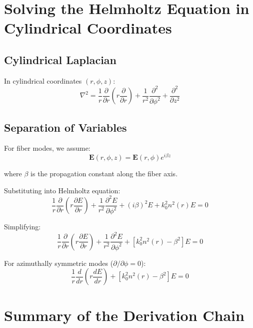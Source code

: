 \documentclass[12pt]{article}
\begin{document}
\section{Solving the Helmholtz Equation in Cylindrical Coordinates}

\subsection{Cylindrical Laplacian}

In cylindrical coordinates $(r, \phi, z)$:
\begin{equation}
\nabla^2 = \frac{1}{r}\frac{\partial}{\partial r}\left(r \frac{\partial}{\partial r}\right) + \frac{1}{r^2}\frac{\partial^2}{\partial \phi^2} + \frac{\partial^2}{\partial z^2}
\end{equation}

\subsection{Separation of Variables}

For fiber modes, we assume:
\begin{equation}
\mathbf{E}(r, \phi, z) = \mathbf{E}(r, \phi) e^{i\beta z}
\end{equation}

where $\beta$ is the propagation constant along the fiber axis.

Substituting into Helmholtz equation:
\begin{equation}
\frac{1}{r}\frac{\partial}{\partial r}\left(r \frac{\partial E}{\partial r}\right) + \frac{1}{r^2}\frac{\partial^2 E}{\partial \phi^2} + (i\beta)^2 E + k_0^2 n^2(r) E = 0
\end{equation}

Simplifying:
\begin{equation}
\frac{1}{r}\frac{\partial}{\partial r}\left(r \frac{\partial E}{\partial r}\right) + \frac{1}{r^2}\frac{\partial^2 E}{\partial \phi^2} + \left[k_0^2 n^2(r) - \beta^2\right] E = 0
\end{equation}

For azimuthally symmetric modes ($\partial/\partial \phi = 0$):
\begin{equation}
\frac{1}{r}\frac{d}{dr}\left(r \frac{dE}{dr}\right) + \left[k_0^2 n^2(r) - \beta^2\right] E = 0
\end{equation}

\section{Summary of the Derivation Chain}
\end{document}
